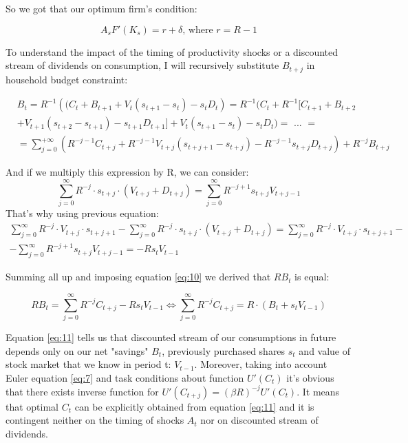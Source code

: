 \documentclass{article}
\begin{document}
So we got that our optimum firm's condition:

\begin{equation}
A_{s} F'(K_s) = r+\delta\text{, where } r = R-1
\end{equation}

To understand the impact of the timing of productivity shocks or a discounted stream of dividends on consumption, I will recursively substitute $B_{t+j}$ in household budget constraint:

\begin{align*}
	&B_t = R^{-1}\left( (C_t + B_{t+1} + V_t(s_{t+1} - s_t) -s_tD_t\right) = R^{-1}( C_t + R^{-1}[C_{t+1} + B_{t+2} \\
	& + V_{t+1}(s_{t+2}-s_{t+1}) -s_{t+1}D_{t+1}] + V_t(s_{t+1} - s_t) - s_tD_t) = \text{ ... } = \\
	& = \sum_{j=0}^{+\infty}\left( R^{-j-1}C_{t+j} + R^{-j-1}V_{t+j}(s_{t+j+1} - s_{t+j}) - R^{-j-1}s_{t+j}D_{t+j}\right) + R^{-j}B_{t+j}
\end{align*}

And if we multiply this expression by R, we can consider:
\begin{equation*}
	\sum _ { j = 0 } ^ { \infty } R ^ { - j } \cdot s_{ t + j } \cdot ( V _ { t + j } + D _ { t + j } ) = \sum _ { j = 0 } ^ { \infty } R ^ { - j + 1 } s _ { t + j } V _ { t + j - 1 }
\end{equation*}
That's why using previous equation:
\begin{multline}\label{eq:10}
	\sum _ { j = 0 } ^ { \infty } R ^ { - j } \cdot V _ { t + j } \cdot s _ { t + j + 1 } - \sum _ { j = 0 } ^ { \infty } R ^ { - j } \cdot s_{ t + j } \cdot ( V _ { t + j } + D _ { t + j } ) =  \sum _ { j = 0 } ^ { \infty } R ^ { - j } \cdot V _ { t + j } \cdot s _ { t + j + 1 } - \\
	- \sum _ { j = 0 } ^ { \infty } R ^ { - j + 1 } s _ { t + j } V _ { t + j - 1 } = -Rs_tV_{t-1}
\end{multline}

Summing all up and imposing equation \ref{eq:10} we derived that $ RB_t $ is equal:


\begin{equation} \label{eq:11}
	R B _ { t } = \sum _ { j = 0 } ^ { \infty } R ^ { - j } C _ { t + j } - R s _ { t } V _ { t - 1 } \iff \sum _ { j = 0 } ^ { \infty } R ^ { - j } C _ { t + j } = R \cdot \left( B_t + s_t V_{t-1}\right) 
\end{equation}

Equation \ref{eq:11} tells us that discounted stream of our consumptions in future depends only on our net "savings" $ B_t $, previously purchased shares $ s_t $ and value of stock market that we know in period t: $ V_{t-1} $. Moreover, taking into account Euler equation \ref{eq:7} and task conditions about function $ U'(C_t) $ it's obvious that there exists inverse function for $ U'(C_{t+j}) = (\beta R)^{-j} U'(C_t) $. It means that optimal $ C_t $ can be explicitly obtained from equation \ref{eq:11} and it is contingent neither on the timing of shocks $ A_t $ nor on discounted stream of dividends.
\end{document}
